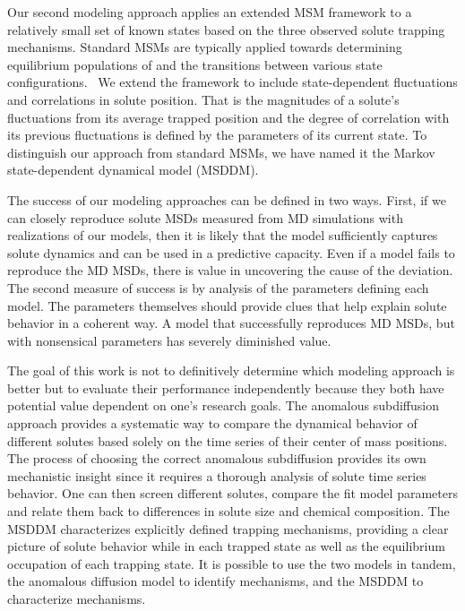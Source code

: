 \documentclass{article}
\begin{document}
  Our second modeling approach applies an extended MSM framework to a relatively 
  small set of known states based on the three observed solute trapping mechanisms.  
  Standard MSMs are typically applied towards determining equilibrium populations
  of and the transitions between various state configurations.~\cite{bowman_using_2009} 
  We extend the framework to include state-dependent fluctuations and correlations in 
  solute position. 
  That is the magnitudes of a solute's fluctuations from its average trapped 
  position and the degree of correlation with its previous fluctuations is 
  defined by the parameters of its current state. To distinguish our approach from
  standard MSMs, we have named it the Markov state-dependent dynamical model (MSDDM).
  
  The success of our modeling approaches can be defined in two ways. First, if we
  can closely reproduce solute MSDs measured from MD simulations with realizations
  of our models, then it is likely that the model sufficiently captures solute 
  dynamics and can be used in a predictive capacity. Even if a model fails to 
  reproduce the MD MSDs, there is value in uncovering the cause of the deviation.
  The second measure of success is by analysis of the parameters defining each 
  model. The parameters themselves should provide clues that help explain solute 
  behavior in a coherent way. A model that successfully reproduces MD MSDs, but 
  with nonsensical parameters has severely diminished value.
  
  The goal of this work is not to definitively determine which modeling approach
  is better but to evaluate their performance independently because they both
  have potential value dependent on one's research goals. The anomalous subdiffusion
  approach provides a systematic way to compare the dynamical behavior of different
  solutes based solely on the time series of their center of mass positions. The process
  of choosing the correct anomalous subdiffusion provides its own mechanistic insight
  since it requires a thorough analysis of solute time series behavior. One can then
  screen different solutes, compare the fit model parameters and relate them back to 
  differences in solute size and chemical composition. The MSDDM characterizes 
  explicitly defined trapping mechanisms, providing a clear picture of solute behavior
  while in each trapped state as well as the equilibrium occupation of each trapping state.
  It is possible to use the two models in tandem, the anomalous diffusion model to
  identify mechanisms, and the MSDDM to characterize mechanisms. 
  
\end{document}
